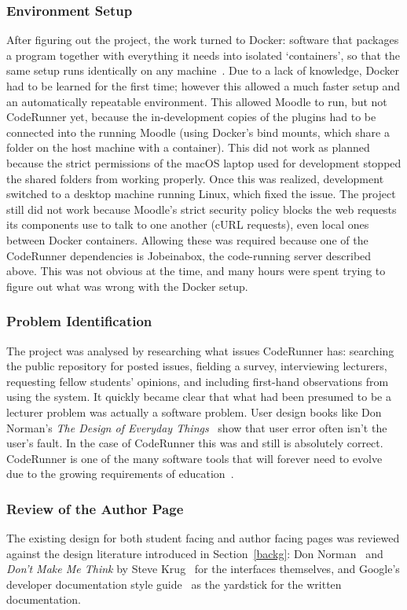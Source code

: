 \subsubsection{Environment Setup}
After figuring out the project, the work turned to Docker: software that packages a program together with everything it needs into isolated `containers', so that the same setup runs identically on any machine~\cite{dockerjournal}. Due to a lack of knowledge, Docker had to be learned for the first time; however this allowed a much faster setup and an automatically repeatable environment.
This allowed Moodle to run, but not CodeRunner yet, because the in-development copies of the plugins had to be connected into the running Moodle (using Docker's bind mounts, which share a folder on the host machine with a container). This did not work as planned because the strict permissions of the macOS laptop used for development stopped the shared folders from working properly. Once this was realized, development switched to a desktop machine running Linux, which fixed the issue.
The project still did not work because Moodle's strict security policy blocks the web requests its components use to talk to one another (cURL requests), even local ones between Docker containers. Allowing these was required because one of the CodeRunner dependencies is Jobeinabox, the code-running server described above. This was not obvious at the time, and many hours were spent trying to figure out what was wrong with the Docker setup.

\subsubsection{Problem Identification}
The project was analysed by researching what issues CodeRunner has:
searching the public repository for posted issues, fielding a survey, interviewing lecturers, requesting fellow students' opinions, and including first-hand observations from using the system.
It quickly became clear that what had been presumed to be a lecturer problem was actually a software problem. User design books like Don Norman's \emph{The Design of Everyday Things}~\cite{designofeveryday} show that user error often isn't the user's fault. In the case of CodeRunner this was and still is absolutely correct. CodeRunner is one of the many software tools that will forever need to evolve due to the growing requirements of education~\cite{pieterse2013automated}.

\subsubsection{Review of the Author Page}
The existing design for both student facing and author facing pages was reviewed against the design literature introduced in Section~\ref{backg}: Don Norman~\cite{designofeveryday} and \emph{Don't Make Me Think} by Steve Krug~\cite{dontmakemethink} for the interfaces themselves, and Google's developer documentation style guide~\cite{googledevstyle} as the yardstick for the written documentation. 

